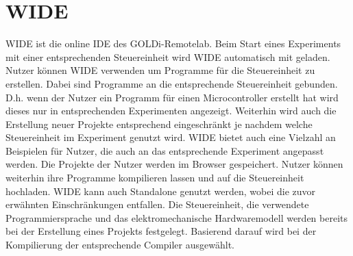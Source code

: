 \section{WIDE}\label{section:grundlagen:wide}
WIDE ist die online IDE des GOLDi-Remotelab. Beim Start eines Experiments mit einer entsprechenden Steuereinheit wird WIDE automatisch mit geladen. Nutzer können WIDE verwenden um Programme für die Steuereinheit zu erstellen. Dabei sind Programme an die entsprechende Steuereinheit gebunden. D.h. wenn der Nutzer ein Programm für einen Microcontroller erstellt hat wird dieses nur in entsprechenden Experimenten angezeigt. Weiterhin wird auch die Erstellung neuer Projekte entsprechend eingeschränkt je nachdem welche Steuereinheit im Experiment genutzt wird. WIDE bietet auch eine Vielzahl an Beispielen für Nutzer, die auch an das entsprechende Experiment angepasst werden. Die Projekte der Nutzer werden im Browser gespeichert. Nutzer können weiterhin ihre Programme kompilieren lassen und auf die Steuereinheit hochladen. WIDE kann auch Standalone genutzt werden, wobei die zuvor erwähnten Einschränkungen entfallen. Die Steuereinheit, die verwendete Programmiersprache und das elektromechanische Hardwaremodell werden bereits bei der Erstellung eines Projekts festgelegt. Basierend darauf wird bei der Kompilierung der entsprechende Compiler ausgewählt.